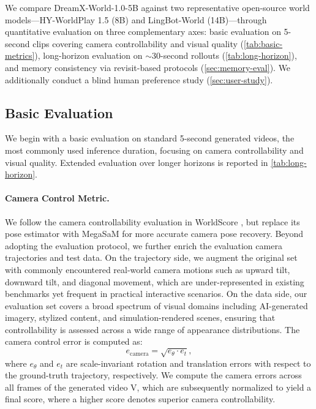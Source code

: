 \documentclass{llmxive}
\providecommand{\evalmodel}{DreamX-World-1.0-5B}
\begin{document}
We compare \evalmodel{} against two representative open-source world models---HY-WorldPlay 1.5 \citep{hyworld2025} (8B) and LingBot-World \citep{gao2026lingbotworld} (14B)---through quantitative evaluation on three complementary axes: basic evaluation on 5-second clips covering camera controllability and visual quality (\cref{tab:basic-metrics}), long-horizon evaluation on ${\sim}$30-second rollouts (\cref{tab:long-horizon}), and memory consistency via revisit-based protocols (\cref{sec:memory-eval}). We additionally conduct a blind human preference study (\cref{sec:user-study}).

\subsection{Basic Evaluation}

We begin with a basic evaluation on standard 5-second generated videos, the most commonly used inference duration, focusing on camera controllability and visual quality. Extended evaluation over longer horizons is reported in \cref{tab:long-horizon}.

\paragraph{\bf{Camera Control Metric.}}
We follow the camera controllability evaluation in WorldScore \citep{duan2025worldscore}, but replace its pose estimator with MegaSaM \citep{li2025megasam} for more accurate camera pose recovery. Beyond adopting the evaluation protocol, we further enrich the evaluation camera trajectories and test data. On the trajectory side, we augment the original set with commonly encountered real-world camera motions such as upward tilt, downward tilt, and diagonal movement, which are under-represented in existing benchmarks yet frequent in practical interactive scenarios. On the data side, our evaluation set covers a broad spectrum of visual domains including AI-generated imagery, stylized content, and simulation-rendered scenes, ensuring that controllability is assessed across a wide range of appearance distributions. The camera control error is computed as:
\begin{equation}
    e_{\mathrm{camera}} = \sqrt{e_{\theta} \cdot e_{t}},
\end{equation}
where $e_{\theta}$ and $e_{t}$ are scale-invariant rotation and translation errors with respect to the ground-truth trajectory, respectively. 
We compute the camera errors across all frames of the generated video V, which are subsequently normalized to yield a final score, where a higher score denotes superior camera controllability.
\end{document}
